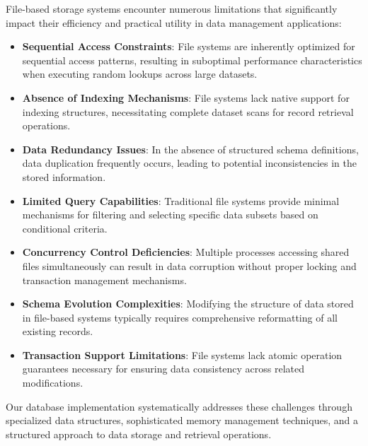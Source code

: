\documentclass[12pt,a4paper]{article}  %
\begin{document}
File-based storage systems encounter numerous limitations that significantly impact their efficiency and practical utility in data management applications:

\begin{mdframed}[linecolor=uetblue, linewidth=1pt, backgroundcolor=lightgray, roundcorner=10pt, innerleftmargin=10pt, innerrightmargin=10pt]
\begin{itemize}
    \item \textbf{Sequential Access Constraints}: File systems are inherently optimized for sequential access patterns, resulting in suboptimal performance characteristics when executing random lookups across large datasets.
    
    \item \textbf{Absence of Indexing Mechanisms}: File systems lack native support for indexing structures, necessitating complete dataset scans for record retrieval operations.
    
    \item \textbf{Data Redundancy Issues}: In the absence of structured schema definitions, data duplication frequently occurs, leading to potential inconsistencies in the stored information.
    
    \item \textbf{Limited Query Capabilities}: Traditional file systems provide minimal mechanisms for filtering and selecting specific data subsets based on conditional criteria.
    
    \item \textbf{Concurrency Control Deficiencies}: Multiple processes accessing shared files simultaneously can result in data corruption without proper locking and transaction management mechanisms.
    
    \item \textbf{Schema Evolution Complexities}: Modifying the structure of data stored in file-based systems typically requires comprehensive reformatting of all existing records.
    
    \item \textbf{Transaction Support Limitations}: File systems lack atomic operation guarantees necessary for ensuring data consistency across related modifications.
\end{itemize}
\end{mdframed}

Our database implementation systematically addresses these challenges through specialized data structures, sophisticated memory management techniques, and a structured approach to data storage and retrieval operations.
\end{document}
